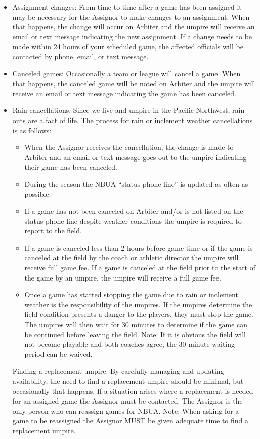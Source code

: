 \documentclass[letterpaper,11pt,colorlinks=true,allcolors=blue]{article}
\begin{document}
\begin{itemize}
\begin{itemize}
\end{itemize}
\item Assignment changes: From time to time after a game has been assigned it may be necessary for the Assignor to make changes to an assignment. When that happens, the change will occur on Arbiter and the umpire will receive an email or text message indicating the new assignment. If a change needs to be made within 24 hours of your scheduled game, the affected officials will be contacted by phone, email, or text message. 
\item Canceled games: Occasionally a team or league will cancel a game. When that happens, the canceled game will be noted on Arbiter and the umpire will receive an email or text message indicating the game has been canceled.  
\item Rain cancellations: Since we live and umpire in the Pacific Northwest, rain outs are a fact of life. The process for rain or inclement weather cancellations is as follows:
\begin{itemize}
\item  When the Assignor receives the cancellation, the change is made to Arbiter and an email or text message goes out to the umpire indicating their game has been canceled.
\item  During the season the NBUA “status phone line” is updated as often as possible.
\item  If a game has not been canceled on Arbiter and/or is not listed on the status phone line despite weather conditions the umpire is required to report to the field.
\item  If a game is canceled less than 2 hours before game time or if the game is canceled at the field by the coach or athletic director the umpire will receive full game fee. If a game is canceled at the field prior to the start of the game by an umpire, the umpire will receive a full game fee.
\item  Once a game has started stopping the game due to rain or inclement weather is the responsibility of the umpires. If the umpires determine the field condition presents a danger to the players, they must stop the game. The umpires will then wait for 30 minutes to determine if the game can be continued before leaving the field. Note: If it is obvious the field will not become playable and both coaches agree, the 30-minute waiting period can be waived.
\end{itemize}
Finding a replacement umpire: By carefully managing and updating availability, the need to find a replacement umpire should be minimal, but occasionally that happens. If a situation arises where a replacement is needed for an assigned game the Assignor must be contacted. The Assignor is the only person who can reassign games for NBUA. Note: When asking for a game to be reassigned the Assignor MUST be given adequate time to find a replacement umpire.

\end{itemize}
\end{document}
